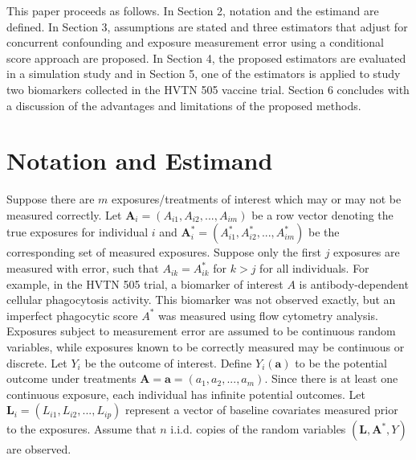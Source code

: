 \documentclass[useAMS,usenatbib,referee]{biom}
\begin{document}
This paper proceeds as follows. In Section 2, notation and the estimand are defined. In Section 3, assumptions are stated and three estimators that adjust for concurrent confounding and exposure measurement error using a conditional score approach are proposed. In Section 4, the proposed estimators are evaluated in a simulation study and in Section 5, one of the estimators is applied to study two biomarkers collected in the HVTN 505 vaccine trial. Section 6 concludes with a discussion of the advantages and limitations of the proposed methods.

\section{Notation and Estimand}
\label{s:notation}

Suppose there are $m$ exposures/treatments of interest which may or may not be measured correctly. Let $\bm{A}_{i} = (A_{i1}, A_{i2}, ..., A_{im})$ be a row vector denoting the true exposures for individual $i$ and $\bm{A}^{*}_{i} =  (A^{*}_{i1}, A^{*}_{i2}, ..., A^{*}_{im})$ be the corresponding set of measured exposures. Suppose only the first $j$ exposures are measured with error, such that $A_{ik} = A^{*}_{ik}$ for $k > j$ for all individuals. For example, in the HVTN 505 trial, a biomarker of interest $A$ is antibody-dependent cellular phagocytosis activity. This biomarker was not observed exactly, but an imperfect phagocytic score $A^{*}$ was measured using flow cytometry analysis. Exposures subject to measurement error are assumed to be continuous random variables, while exposures known to be correctly measured may be continuous or discrete. Let $Y_{i}$ be the outcome of interest. Define $Y_{i}(\bm{a})$ to be the potential outcome under treatments $\bm{A} = \bm{a} = (a_{1}, a_{2}, ..., a_{m})$. Since there is at least one continuous exposure, each individual has infinite potential outcomes. Let $\bm{L}_{i} =  (L_{i1}, L_{i2}, ..., L_{ip})$ represent a vector of baseline covariates measured prior to the exposures. Assume that $n$ i.i.d. copies of the random variables $(\bm{L}, \bm{A}^{*}, Y)$ are observed.
\end{document}
